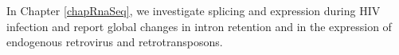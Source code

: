 \documentclass[../sherrill-Mix_thesis.tex]{subfiles}
\begin{document}
	In Chapter \ref{chapRnaSeq}, we investigate splicing and expression during HIV infection and report global changes in intron retention and in the expression of endogenous retrovirus and retrotransposons.
	





\end{document}
